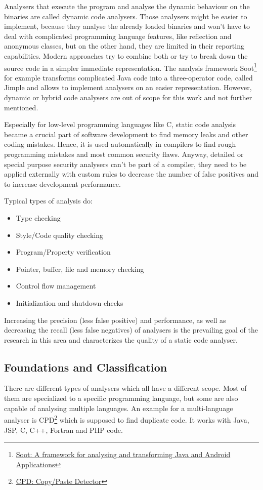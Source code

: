 \documentclass[conference]{IEEEtran}
\begin{document}
Analysers that execute the program and analyse the dynamic behaviour on the binaries are called dynamic code analysers.
Those analysers might be easier to implement, because they analyse the already loaded binaries and won't have to deal with complicated programming language features, like reflection and anonymous classes, but on the other hand, they are limited in their reporting capabilities.
Modern approaches try to combine both or try to break down the source code in a simpler immediate representation.
The analysis framework Soot\footnote{\href{https://sable.github.io/soot/}{Soot: A framework for analysing and transforming Java and Android Applications}} for example transforms complicated Java code into a three-operator code, called Jimple and allows to implement analysers on an easier representation.
However, dynamic or hybrid code analysers are out of scope for this work and not further mentioned.


Especially for low-level programming languages like C, static code analysis became a crucial part of software development to find memory leaks and other coding mistakes.
Hence, it is used automatically in compilers to find rough programming mistakes and most common security flaws.
Anyway, detailed or special purpose security analysers can't be part of a compiler, they need to be applied externally with custom rules to decrease the number of false positives and to increase development performance.

Typical types of analysis do:
\begin{itemize}
	\item Type checking
	\item Style/Code quality checking
	\item Program/Property verification
	\item Pointer, buffer, file and memory checking
	\item Control flow management
	\item Initialization and shutdown checks
\end{itemize}

Increasing the precision (less false positive) and performance, as well as decreasing the recall (less false negatives) of analysers is the prevailing goal of the research in this area and characterizes the quality of a static code analyser.


\subsection{Foundations and Classification}
\label{subsec:static_code_analysis_foundations}
There are different types of analysers which all have a different scope. Most of them are specialized to a specific programming language, but some are also capable of analysing multiple languages. An example for a multi-language analyser is CPD\footnote{\href{http://pmd.sourceforge.net/pmd-4.3.0/cpd.html}{CPD: Copy/Paste Detector}} which is supposed to find duplicate code. It works with Java, JSP, C, C++, Fortran and PHP code.
\end{document}
